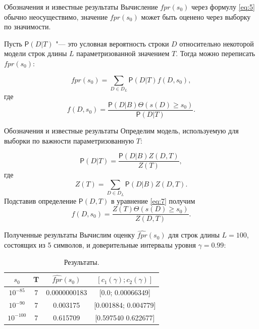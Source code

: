 \documentclass{beamer}
\begin{document}
	\begin{frame}{Обозначения и известные результаты}
		Вычисление $fpr(s_{0})$ через формулу \eqref{eq:5} обычно неосуществимо, значение $fpr(s_{0})$ может быть оценено через выборку по значимости. 
		
		\vspace{0.5cm}
		
		Пусть $\mathsf{P}(D|T)$ "--- это условная вероятность строки $D$ относительно некоторой модели строк длины $L$ параметризованной значением $T$. Тогда можно переписать $fpr(s_{0})$:		
		
		\begin{equation*}
			fpr(s_{0}) = \sum_{D \in D_{L}} \mathsf{P}(D|T) f(D,s_{0}), \label{eq:6}
		\end{equation*}
		где
		\begin{equation}
			f(D,s_{0}) = \frac{\mathsf{P}(D|B) \Theta(s(D) \geq s_{0})}{\mathsf{P}(D|T)}. \label{eq:7}
		\end{equation}				
	\end{frame}

	\begin{frame}{Обозначения и известные результаты}
		Определим модель, используемую для выборки по важности параметризованную $T$:		
		
		\begin{equation*}
			\mathsf{P}(D|T) = \frac{\mathsf{P}(D|B)Z(D,T)}{Z(T)}, \label{eq:8}
		\end{equation*}							
		где 
		\begin{equation*}
			Z(T) = \sum_{D \in D_{L}}\mathsf{P}(D|B)Z(D,T). \label{eq:9}
		\end{equation*}
		Подставив определение $\mathsf{P}(D,T)$ в уравнение \eqref{eq:7} получим
		\begin{equation*}
			f(D,s_{0}) = \frac{Z(T)\Theta(s(D) \geq s_{0})}{Z(D,T)}. \label{eq:10}
		\end{equation*}	
	\end{frame}

	\begin{frame}{Полученные результаты}
		Вычислим оценку $\widehat{fpr}(s_{0})$ для строк длины $L=100$, состоящих из 5 символов, и доверительные интервалы уровня $\gamma = 0.99$:		
		\begin{table}
			\caption{Результаты.} \label{tb:1}
			\begin{tabular}{cccc}
				$s_{0}$&T&$\widehat{fpr}(s_{0})$&$[c_{1}(\gamma);c_{2}(\gamma)]$  \\ \hline
				$10^{-85}$&7&0.0000000183&[0.0; 0.00066349] \\
				$10^{-90}$&7&0.003175&[0.001884; 0.004779] \\ 
				$10^{-100}$&7&0.615709&[0.597540 0.622677] \\
			\end{tabular}
		\end{table}								
	\end{frame}
\end{document}
